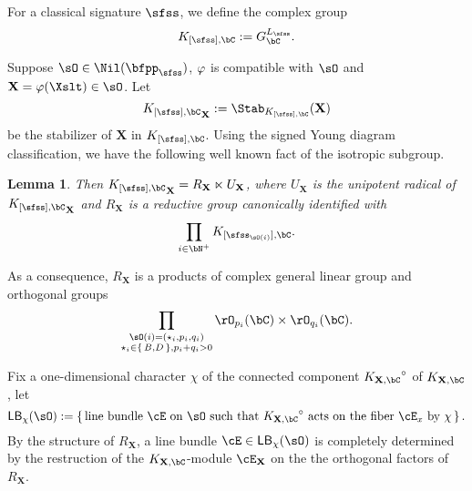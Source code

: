 \documentclass[12pt,a4paper]{amsart}
\def\Im{\operatorname{Im}}
\newcommand{\X}{\mathbf{X}}
\numberwithin{equation}{section}
\newtheorem{lem}[thm]{Lemma}
\theoremstyle{remark}
\begin{document}
For a classical signature $\sfss$, we define the complex group
\[
  \KC[[\sfss]] := \GC^{L_{\sfss}}.
\]

 Suppose $\sO\in \Nil(\bfpp_{\sfss})$, $\varphi$ is
compatible with $\sO$ and $\X = \SLT(\Xslt)\in \sO$. Let
\[
  \KC[[\sfss]]_{\X}:=\Stab_{\KC[[\sfss]]}(\X)
\]
be the stabilizer of $\X$ in
$\KC[[\sfss]]$.
Using the signed Young diagram classification, we have the following well known
fact of the isotropic subgroup.
\begin{lem}\label{lem:KX1}
 Then $\KC[[\sfss]]_{\X}= R_\X\ltimes U_\X$,
  where $U_\X$ is the unipotent radical of $\KC[[\sfss]]_{\X}$ and $R_{\X}$ is a reductive
  group canonically identified with
 \[
   \prod_{i\in \bN^{+}} \KC[[\sfss_{\sO(i)}]].
 \]
\end{lem}
As a consequence, $R_{\X}$ is a products of complex general linear group and
orthogonal groups
\[
  \prod_{\substack{\sO(i)=(\star_{i},p_{i},q_{i})\\
      \star_{i}\in \set{B,D}, p_{i}+q_{i}>0
    }} \rO_{p_{i}}(\bC)\times \rO_{q_{i}}(\bC).
\]

\medskip

\def\DCO#1{\mathsf{LB}_{#1}(\sO)}

Fix a one-dimensional character $\chi$ of the connected component $\KC[\X]^{\circ}$ of $\KC[\X]$,
let
\[
\DCO{\chi} := \set{\text{line bundle $\cE$ on $\sO$ such that $\KC[\X]^{\circ}$
    acts on the fiber $\cE_{x}$ by $\chi$}}.
\]
By the structure of $R_{\X}$, a line bundle $\cE\in \DCO{\chi}$ is completely
determined by
the restruction of the $\KC[\X]$-module $\cE_{\X}$ on the
the orthogonal factors of $R_{\X}$.
\end{document}
